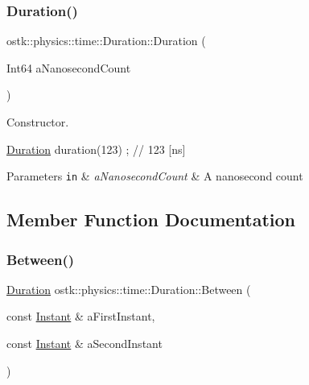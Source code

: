 \subsubsection{\texorpdfstring{Duration()}{Duration()}}
{\footnotesize\ttfamily ostk\+::physics\+::time\+::\+Duration\+::\+Duration (\begin{DoxyParamCaption}\item[{Int64}]{a\+Nanosecond\+Count }\end{DoxyParamCaption})}



Constructor. 


\begin{DoxyCode}
\hyperlink{classostk_1_1physics_1_1time_1_1_duration_a6ba3a020742ca6e3bf0b1970dd039c07}{Duration} duration(123) ; \textcolor{comment}{// 123 [ns]}
\end{DoxyCode}
 
\begin{DoxyParams}[1]{Parameters}
\mbox{\tt in}  & {\em a\+Nanosecond\+Count} & A nanosecond count \\
\hline
\end{DoxyParams}


\subsection{Member Function Documentation}
\mbox{\label{classostk_1_1physics_1_1time_1_1_duration_a6e3ed5971283cccf4cbc591dd7919efa}} 
\subsubsection{\texorpdfstring{Between()}{Between()}}
{\footnotesize\ttfamily \hyperlink{classostk_1_1physics_1_1time_1_1_duration}{Duration} ostk\+::physics\+::time\+::\+Duration\+::\+Between (\begin{DoxyParamCaption}\item[{const \hyperlink{classostk_1_1physics_1_1time_1_1_instant}{Instant} \&}]{a\+First\+Instant,  }\item[{const \hyperlink{classostk_1_1physics_1_1time_1_1_instant}{Instant} \&}]{a\+Second\+Instant }\end{DoxyParamCaption})\hspace{0.3cm}{\ttfamily [static]}}



